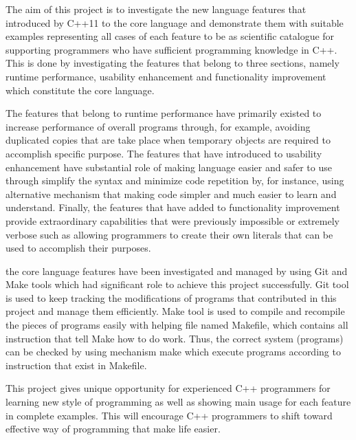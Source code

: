 \documentclass[11pt]{report}
\begin{document}
The aim  of this project is to investigate the new language features that introduced by C++11 to the core language and demonstrate them with suitable examples representing all cases of each feature to be as scientific catalogue for supporting programmers who have sufficient programming knowledge in C++.  This is done by investigating the features that belong to three sections, namely runtime performance, usability enhancement and functionality improvement which constitute the core language.

The features that belong to runtime performance have primarily existed to increase performance of overall programs through, for example, avoiding duplicated copies that are take place when temporary objects are required to accomplish specific purpose. The features that have introduced to usability enhancement have substantial role of making language easier and safer to use through simplify the syntax and minimize code repetition by, for instance, using alternative mechanism that making code simpler and much easier to learn and understand. Finally, the features that have added to functionality improvement  provide extraordinary capabilities that were previously impossible or extremely verbose such as allowing programmers to create their own literals that can be used to accomplish their purposes. 

the core language features have been investigated and managed by using Git and Make tools which had significant role to achieve this project successfully. Git tool is used to keep tracking the modifications of programs that contributed in this project and manage them efficiently. Make tool is used to compile and recompile the pieces of programs easily with helping file named Makefile, which contains all instruction that tell Make how to do work. Thus, the correct system (programs) can be checked by using mechanism make which execute programs according to instruction that exist in Makefile.

This project gives unique opportunity for experienced C++ programmers for learning new style of programming as well as showing main usage for each feature in complete examples. This will encourage C++ programmers to shift toward effective way of programming that make life easier.
\end{document}
